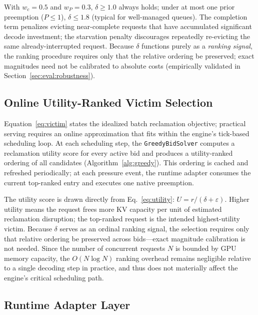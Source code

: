 \documentclass[sigconf,nonacm]{acmart}
\newcommand{\utilfn}{\ensuremath{U}}
\newcommand{\tokfree}{\ensuremath{r}}
\newcommand{\qualdelta}{\ensuremath{\delta}}
\newcommand{\stabeps}{\ensuremath{\varepsilon}}
\begin{document}
With $w_c{=}0.5$ and $w_P{=}0.3$, $\qualdelta \geq 1.0$ always holds;
under at most one prior preemption ($P{\leq}1$), $\qualdelta \leq 1.8$
(typical for well-managed queues).
The completion term penalizes evicting near-complete requests that have
accumulated significant decode investment; the starvation penalty
discourages repeatedly re-evicting the same already-interrupted request.
Because $\qualdelta$ functions purely as a \emph{ranking signal}, the
ranking procedure requires only that the relative ordering be preserved; exact
magnitudes need not be calibrated to absolute costs
(empirically validated in Section~\ref{sec:eval:robustness}).

\subsection{Online Utility-Ranked Victim Selection}\label{sec:design:solver}

Equation~\ref{eq:victim} states the idealized batch reclamation objective;
practical serving requires an online approximation that fits within the
engine's tick-based scheduling loop.  At each scheduling step, the
\texttt{GreedyBidSolver} computes a reclamation utility score for every
active bid and produces a utility-ranked ordering of all candidates
(Algorithm~\ref{alg:greedy}).  This ordering is cached and refreshed
periodically; at each pressure event, the runtime adapter consumes the
current top-ranked entry and executes one native preemption.



The utility score is drawn directly from Eq.~\ref{eq:utility}:
$\utilfn = \tokfree / (\qualdelta + \stabeps)$.  Higher utility means the
request frees more KV capacity per unit of estimated reclamation disruption;
the top-ranked request is the intended highest-utility victim.
Because $\qualdelta$ serves as an ordinal ranking signal, the selection
requires only that relative ordering be preserved across bids---exact
magnitude calibration is not needed. Since the number of concurrent requests $N$ is bounded by GPU memory capacity, the $O(N \log N)$ ranking overhead remains negligible relative to a single decoding step in practice, and thus does not materially affect the engine's critical scheduling path.

\subsection{Runtime Adapter Layer}\label{sec:design:adapter}
\end{document}
